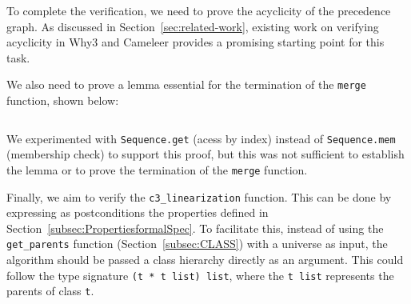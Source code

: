 \documentclass[runningheads]{llncs}
\begin{document}
To complete the verification, we need to prove the acyclicity of the precedence graph. 
As discussed in Section~\ref{sec:related-work}, existing work on verifying acyclicity in Why3 and Cameleer provides a promising starting point for this task.

We also need to prove a lemma essential for the termination of the \texttt{merge} function, shown below:

\inputminted[firstline=151,lastline=158,fontsize=\small,linenos,xleftmargin=20pt]{ocaml}{../cameleer/c3.ml}

We experimented with \texttt{Sequence.get} (acess by index) instead of \texttt{Sequence.mem} 
(membership check) to support this proof, 
but this was not sufficient to establish the lemma or to prove the termination of the \texttt{merge} function.

Finally, we aim to verify the \texttt{c3\_linearization} function. This can be done by expressing as postconditions the 
properties defined in Section~\ref{subsec:PropertiesformalSpec}. To facilitate this, instead of using the \texttt{get\_parents} function (Section~\ref{subsec:CLASS}) with a universe as input, 
the algorithm should be passed a class hierarchy directly as an argument. This could follow the type signature \texttt{(t * t list) list}, where the \texttt{t list} represents the parents of class \texttt{t}.
\printbibliography
\end{document}
